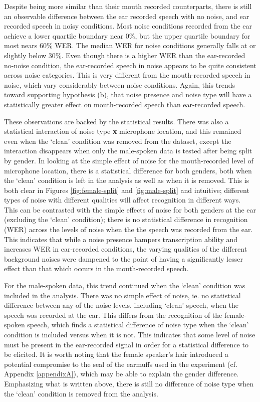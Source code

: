 Despite being more similar than their mouth recorded counterparts, there is still an observable difference between the ear recorded speech with no noise, and ear recorded speech in noisy conditions.  Most noise conditions recorded from the ear achieve a lower quartile boundary near 0\%, but the upper quartile boundary for most nears 60\% WER.  The median WER for noise conditions generally falls at or slightly below 30\%. 
Even though there is a higher WER than the ear-recorded no-noise condition, the ear-recorded speech in noise appears to be quite consistent across noise categories.  This is very different from the mouth-recorded speech in noise, which vary considerably between noise conditions. Again, this trends toward supporting hypothesis (b), that noise presence and noise type will have a statistically greater effect on mouth-recorded speech than ear-recorded speech.

These observations are backed by the statistical results.  There was also a statistical interaction of noise type \textbf{x} microphone location, and this remained even when the `clean' condition was removed from the dataset, except the interaction disappears when only the male-spoken data is tested after being split by gender.  In looking at the simple effect of noise for the mouth-recorded level of microphone location, there is a statistical difference for both genders, both when the `clean' condition is left in the analysis as well as when it is removed.  This is both clear in Figures \ref{fig:female-split} and \ref{fig:male-split} and intuitive; different types of noise with different qualities will affect recognition in different ways.  This can be contrasted with the simple effects of noise for both genders at the ear (excluding the `clean' condition); there is no statistical difference in recognition (WER) across the levels of noise when the the speech was recorded from the ear.  This indicates that while a noise presence hampers transcription ability and increases WER in ear-recorded conditions, the varying qualities of the different background noises were dampened to the point of having a significantly lesser effect than that which occurs in the mouth-recorded speech.

For the male-spoken data, this trend continued when the `clean' condition was included in the analysis.  There was no simple effect of noise, ie. no statistical difference between any of the noise levels, including `clean' speech, when the speech was recorded at the ear.  This differs from the recognition of the female-spoken speech, which finds a statistical difference of noise type when the `clean' condition is included versus when it is not.  This indicates that some level of noise must be present in the ear-recorded signal in order for a statistical difference to be elicited.  It is worth noting that the female speaker's hair introduced a potential compromise to the seal of the earmuffs used in the experiment (cf. Appendix \ref{appendixA}), which may be able to explain the gender difference. Emphasizing what is written above, there is still no difference of noise type when the `clean' condition is removed from the analysis.

